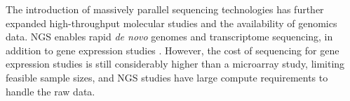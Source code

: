 The introduction of massively parallel sequencing technologies has further expanded high-throughput molecular studies and the availability of \glspl{genomic} data. \gls{NGS} enables rapid \textit{de novo} \glspl{genome} and \gls{transcriptome} sequencing, in addition to \gls{gene expression} studies \citep{Goodwin2016}.  %
However, the cost of sequencing for \gls{gene expression} studies is still considerably higher than a \gls{microarray} study, limiting feasible sample sizes, and
\gls{NGS} studies have large compute requirements to handle the raw data. %
%
